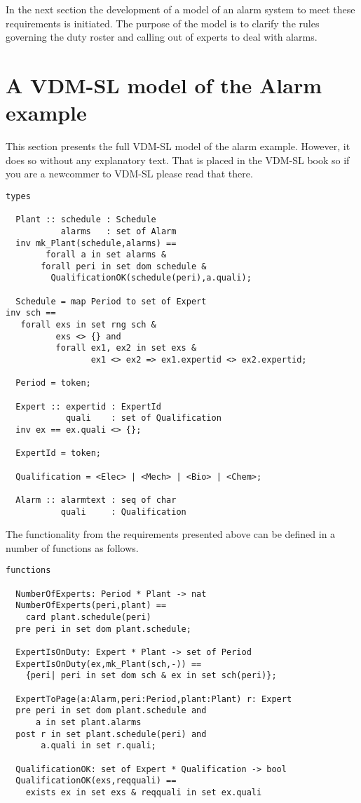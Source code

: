 In the next section the development of a model of an alarm
system to meet these requirements is initiated. The purpose of the model is to
clarify the rules governing the duty roster and calling out of experts
to deal with alarms.

\section{A VDM-SL model of the Alarm example}\label{sec:VDMModel}

This section presents the full VDM-SL model
of the alarm example. However, it does so without any explanatory
text. That is placed in the VDM-SL book so if you are a newcommer to
VDM-SL please read that there.

\begin{lstlisting}
types

  Plant :: schedule : Schedule
           alarms   : set of Alarm
  inv mk_Plant(schedule,alarms) ==
        forall a in set alarms &
	   forall peri in set dom schedule &
	     QualificationOK(schedule(peri),a.quali);
	     
  Schedule = map Period to set of Expert
inv sch ==
   forall exs in set rng sch &
          exs <> {} and
          forall ex1, ex2 in set exs &
                 ex1 <> ex2 => ex1.expertid <> ex2.expertid;

  Period = token;

  Expert :: expertid : ExpertId
            quali    : set of Qualification
  inv ex == ex.quali <> {};

  ExpertId = token;

  Qualification = <Elec> | <Mech> | <Bio> | <Chem>;
	   
  Alarm :: alarmtext : seq of char
           quali     : Qualification
\end{lstlisting}

The functionality from the requirements presented above can be defined
in a number of functions as follows.

\begin{lstlisting}
functions

  NumberOfExperts: Period * Plant -> nat
  NumberOfExperts(peri,plant) ==
    card plant.schedule(peri)
  pre peri in set dom plant.schedule;

  ExpertIsOnDuty: Expert * Plant -> set of Period
  ExpertIsOnDuty(ex,mk_Plant(sch,-)) ==
    {peri| peri in set dom sch & ex in set sch(peri)};

  ExpertToPage(a:Alarm,peri:Period,plant:Plant) r: Expert
  pre peri in set dom plant.schedule and
      a in set plant.alarms
  post r in set plant.schedule(peri) and
       a.quali in set r.quali;

  QualificationOK: set of Expert * Qualification -> bool
  QualificationOK(exs,reqquali) ==
    exists ex in set exs & reqquali in set ex.quali
\end{lstlisting}

